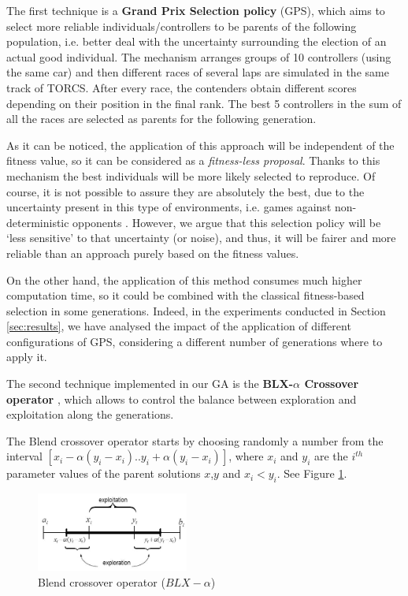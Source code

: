 \documentclass[10pt,journal,compsoc]{IEEEtran}
\begin{document}
The first technique is a \textbf{Grand Prix Selection policy} (GPS), which aims to select more reliable individuals/controllers to be parents of the following population, i.e. better deal with the uncertainty surrounding the election of an actual good individual. The mechanism arranges groups of 10 controllers (using the same car) and then different races of several laps are simulated in the same track of TORCS. After every race, the contenders obtain different scores depending on their position in the final rank. The best 5 controllers in the sum of all the races are selected as parents for the following generation. 

As it can be noticed, the application of this approach will be independent of the fitness value, so it can be considered as a \textit{fitness-less proposal}.
Thanks to this mechanism the best individuals will be more likely
selected to reproduce. Of course, it is not possible to assure they
are absolutely the best, due to the uncertainty present in this type
of environments, i.e. games against non-deterministic opponents
\cite{merelo2016statistical}. However, we argue that this selection
policy will be `less sensitive' to that uncertainty (or noise), and
thus, it will be fairer and more reliable than an approach purely
based on the fitness values.  

On the other hand, the application of this method consumes much higher computation time, so it could be combined with the classical fitness-based selection in some generations. Indeed, in the experiments conducted in Section \ref{sec:results}, we have analysed the impact of the application of different configurations of GPS, considering a different number of generations where to apply it.

The second technique implemented in our GA is the \textbf{BLX-$\alpha$ Crossover operator} \cite{blx2008}, which allows to control the balance between exploration and exploitation along the generations.

The Blend crossover operator starts by choosing randomly a number from the interval $[x_i-\alpha(y_i-x_i).. y_i+\alpha(y_i-x_i)]$, where $x_i$ and $y_i$ are the $i^{th}$ parameter values of the parent solutions $x$,$y$ and $x_i < y_i$. See Figure \ref{fig:blxalpha}.

 \begin{figure}[!ht]	
 	\begin{center}
 		\includegraphics[width=5cm]{fig/blxalpha.jpg}
 		\caption{Blend crossover operator ($BLX-\alpha$)}
 		\label{fig:blxalpha}	
 	\end{center}	
 \end{figure}
\end{document}
